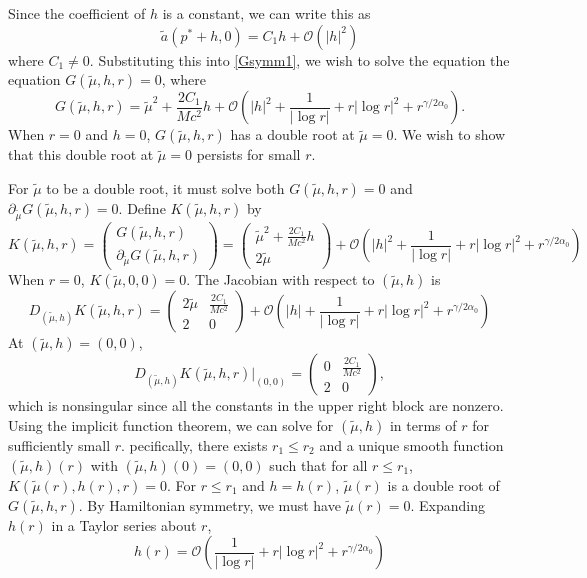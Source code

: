 \documentclass[thesis.tex]{subfiles}
\begin{document}
Since the coefficient of $h$ is a constant, we can write this as
\[
\tilde{a}(p^* + h, 0) = C_1 h + \mathcal{O}(|h|^2) 
\]
where $C_1 \neq 0$. Substituting this into \cref{Gsymm1}, we wish to solve the equation the equation $G(\tilde{\mu}, h, r) = 0$, where
\begin{equation}\label{Gsymm2}
G(\tilde{\mu}, h, r) = \tilde{\mu}^2 + \frac{2C_1}{M c^2}h + \mathcal{O}\left( |h|^2 + \frac{1}{|\log r|} + r |\log r|^2 + r^{\gamma/2\alpha_0} \right).
\end{equation}
When $r = 0$ and $h = 0$, $G(\tilde{\mu}, h, r)$ has a double root at $\tilde{\mu} = 0$. We wish to show that this double root at $\tilde{\mu} = 0$ persists for small $r$.

For $\tilde{\mu}$ to be a double root, it must solve both $G(\tilde{\mu}, h, r) = 0$ and $\partial_{\tilde{\mu}} G(\tilde{\mu}, h, r) = 0$. Define $K(\tilde{\mu}, h, r)$ by
\begin{equation}
K(\tilde{\mu}, h, r) = 
\begin{pmatrix}G(\tilde{\mu}, h, r) \\ \partial_{\tilde{\mu}}G(\tilde{\mu}, h, r) \end{pmatrix} 
= \begin{pmatrix}
\tilde{\mu}^2 + \frac{2C_1}{M c^2}h \\
2 \tilde{\mu}
\end{pmatrix}
+ \mathcal{O}\left( |h|^2 + \frac{1}{|\log r|} + r |\log r|^2 + r^{\gamma/2\alpha_0} \right)
\end{equation}
When $r = 0$, $K(\tilde{\mu}, 0, 0) = 0$. The Jacobian with respect to $(\tilde{\mu}, h)$ is
\[
D_{(\tilde{\mu}, h)}K(\tilde{\mu}, h, r) = 
\begin{pmatrix}
2 \tilde{\mu} & \frac{2C_1}{M c^2} \\
2 & 0
\end{pmatrix}
+ \mathcal{O}\left( |h| + \frac{1}{|\log r|} + r |\log r|^2 + r^{\gamma/2\alpha_0} \right)
\]
At $(\tilde{\mu}, h) = (0,0)$, 
\[
D_{(\tilde{\mu}, h)}K(\tilde{\mu}, h, r)\Big|_{(0,0)} = 
\begin{pmatrix}
0 & \frac{2C_1}{M c^2} \\
2 & 0
\end{pmatrix},
\]
which is nonsingular since all the constants in the upper right block are nonzero. Using the implicit function theorem, we can solve for $(\tilde{\mu}, h)$ in terms of $r$ for sufficiently small $r$. pecifically, there exists $r_1 \leq r_2$ and a unique smooth function $(\tilde{\mu}, h)(r)$ with $(\tilde{\mu}, h)(0) = (0, 0)$ such that for all $r \leq r_1$, $K(\tilde{\mu}(r), h(r), r) = 0$. For $r \leq r_1$ and $h = h(r)$, $\tilde{\mu}(r)$ is a double root of $G(\tilde{\mu}, h, r)$. By Hamiltonian symmetry, we must have $\tilde{\mu}(r) = 0$. Expanding $h(r)$ in a Taylor series about $r$, 
\begin{equation*}
h(r) = \mathcal{O}\left( \frac{1}{|\log r|} + r |\log r|^2 + r^{\gamma/2\alpha_0} \right)
\end{equation*}
\end{document}
